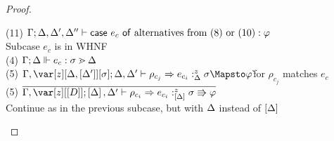 \begin{proof}
\begin{tabbing}
    (11) $\Gamma;\Delta,\Delta',\Delta'' \vdash \mathsf{case}~e_c~\mathsf{of}~\textrm{alternatives from}~(8)~\textrm{or}~(10) : \varphi$\\
    Subcase $e_c$ is in WHNF\\
    (4) $\Gamma; \Delta \Vdash e_c : \sigma \gtrdot \Delta$\\
    (5) $\G, \zD; \D,\D' \vdash \rho_{c_j} \Rightarrow e_{c_i} :^z_\D \s \Mapsto \vp$\`for $\rho_{c_j}$ matches $e_c$\\
    (5) $\ov{\G, \z[\irr{D}]; \irr{\D},\D' \vdash \rho_{c_i} \Rightarrow e_{c_i} :^z_{\irr{\D}} \s \Rrightarrow \vp}$\\
    Continue as in the previous subcase, but with $\Delta$ instead of $\left[\Delta\right]$\\

\end{tabbing}
\end{proof}
